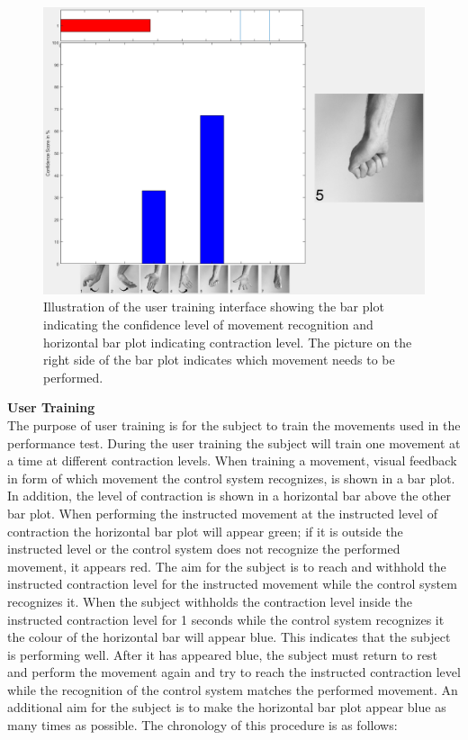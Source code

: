 \begin{figure}[H]                 
	\includegraphics[width=.8\textwidth]{figures/xBackground/usertraintestGUI}  
	\caption{Illustration of the user training interface showing the bar plot indicating the confidence level of movement recognition and horizontal bar plot indicating contraction level. The picture on the right side of the bar plot indicates which movement needs to be performed.}
	\label{fig:usertraintestGUI} 
\end{figure}

\textbf{User Training} \\ %
The purpose of user training is for the subject to train the movements used in the performance test. During the user training the subject will train one movement at a time at different contraction levels. When training a movement, visual feedback in form of which movement the control system recognizes, is shown in a bar plot. In addition, the level of contraction is shown in a horizontal bar above the other bar plot. When performing the instructed movement at the instructed level of contraction the horizontal bar plot will appear green; if it is outside the instructed level or the control system does not recognize the performed movement, it appears red. The aim for the subject is to reach and withhold the instructed contraction level for the instructed movement while the control system recognizes it. When the subject withholds the contraction level inside the instructed contraction level for 1 seconds while the control system recognizes it the colour of the horizontal bar will appear blue. This indicates that the subject is performing well. After it has appeared blue, the subject must return to rest and perform the movement again and try to reach the instructed contraction level while the recognition of the control system matches the performed movement. An additional aim for the subject is to make the horizontal bar plot appear blue as many times as possible. The chronology of this procedure is as follows:

